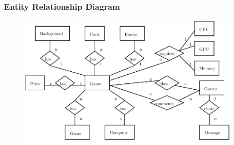 \begin{frame}
\frametitle{Entity Relationship Diagram}

\begin{figure}
	\includegraphics[scale=0.7]{erd.pdf}
\end{figure}

\end{frame}
